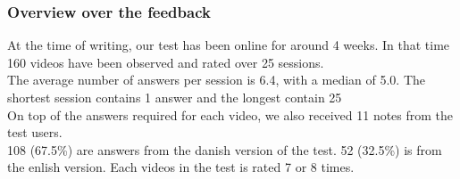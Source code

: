 \subsubsection{Overview over the feedback}
%
At the time of writing, our test has been online for around 4 weeks. In that time 160 videos have been observed and rated over 25 sessions.\\
The average number of answers per session is 6.4, with a median of 5.0. The shortest session contains 1 answer and the longest contain 25\\
On top of the answers required for each video, we also received 11 notes from the test users.\\
108 (67.5\%) are answers from the danish version of the test. 52 (32.5\%) is from the enlish version. Each videos in the test is rated 7 or 8 times.
%
